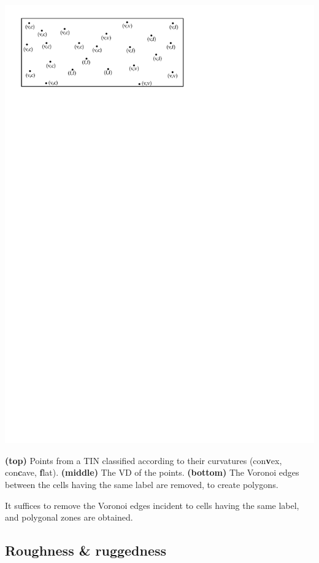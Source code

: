 \begin{marginfigure}
  \includegraphics[page=3,width=\linewidth]{figs/vd}
  \caption{\textbf{(top)} Points from a TIN classified according to their curvatures (con\textbf{v}ex, con\textbf{c}ave, \textbf{f}lat). \textbf{(middle)} The VD of the points. \textbf{(bottom)} The Voronoi edges between the cells having the same label are removed, to create polygons.}%
\label{fig:vd}
\end{marginfigure}
It suffices to remove the Voronoi edges incident to cells having the same label, and polygonal zones are obtained.


%
\subsection{Roughness \& ruggedness}%

